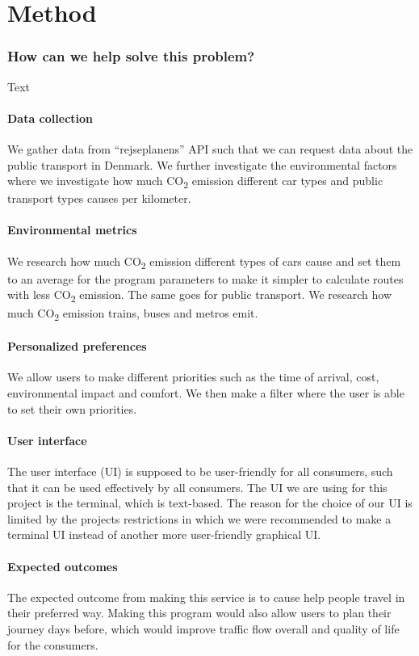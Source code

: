 \chapter{Method}\label{ch:method}

\subsection{How can we help solve this problem?}\label{subsec:how-can-we-help-solve-this-problem?}

Text

\subsubsection{Data collection}

We gather data from ``rejseplanens'' API such that we can request data about the public transport in Denmark.
We further investigate the environmental factors where we investigate how much \unit{CO_{2}} emission
different car types and public transport types causes per kilometer.

\subsubsection{Environmental metrics}

We research how much \unit{CO_{2}} emission different types of cars cause and set them to an average for
the program parameters to make it simpler to calculate routes with less \unit{CO_{2}} emission.
The same goes for public transport. We research how much \unit{CO_{2}} emission trains, buses and
metros emit.

\subsubsection{Personalized preferences}

We allow users to make different priorities such as the time of arrival, cost, environmental impact and comfort.
We then make a filter where the user is able to set their own priorities.

\subsubsection{User interface}

The user interface (UI) is supposed to be user-friendly for all consumers, such that it can be used effectively by all
consumers.
The UI we are using for this project is the terminal, which is text-based.
The reason for the choice of our UI is limited by the projects restrictions in which we were recommended to make a
terminal UI instead of another more user-friendly graphical UI.

\subsubsection{Expected outcomes}

The expected outcome from making this service is to cause help people travel in their preferred way.
Making this program would also allow users to plan their journey days before, which would improve traffic flow
overall and quality of life for the consumers.
